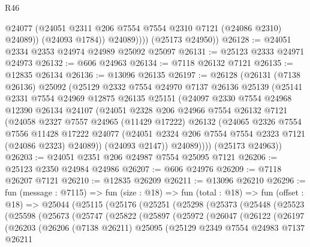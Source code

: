 \begin{lexlean}{R46}
\begin{coremodule}
                  @24077
                  (@24051 @2311 @206 @7554 @7554 @2310 @7121 (@24086 @2310) @24089))
                (@24093 @1784))
              @24089))))
      (@25173 @24950))
@26128 := @24051 @2334 @2353 @24974 @24989 @25092 @25097
@26131 := @25123 @2333 @24971 @24973
@26132 := @606 @24963
@26134 := @7118 @26132 @7121
@26135 := @12835 @26134
@26136 := @13096 @26135
@26197 := @26128
    (@26131
      (@7138 @26136)
      @25092
      (@25129
        @2332
        @7554
        @24970
        @7137
        @26136
        @25139
        (@25141
          @2331
          @7554
          @24969
          @12875
          @26135
          @25151
          (@24097
            @2330
            @7554
            @24968
            @12390
            @26134
            @24107
            (@24051
              @2328
              @206
              @24966
              @7554
              @26132
              @7121
              (@24058
                @2327
                @7557
                @24965
                (@11429 @17222)
                @26132
                (@24065
                  @2326
                  @7554
                  @7556
                  @11428
                  @17222
                  @24077
                  (@24051 @2324 @206 @7554 @7554 @2323 @7121 (@24086 @2323) @24089))
                (@24093 @2147))
              @24089))))
      (@25173 @24963))
@26203 := @24051 @2351 @206 @24987 @7554 @25095 @7121
@26206 := @25123 @2350 @24984 @24986
@26207 := @606 @24976
@26209 := @7118 @26207 @7121
@26210 := @12835 @26209
@26211 := @13096 @26210
@26296 := fun (message : @7115) =>
  fun (size : @18) =>
  fun (total : @18) =>
  fun (offset : @18) =>
  @25044
    (@25115
      (@25176
        (@25251
          (@25298
            (@25373
              (@25448
                (@25523
                  (@25598
                    (@25673
                      (@25747
                        (@25822
                          (@25897
                            (@25972
                              (@26047
                                (@26122
                                  (@26197
                                    (@26203
                                      (@26206
                                        (@7138 @26211)
                                        @25095
                                        (@25129
                                          @2349
                                          @7554
                                          @24983
                                          @7137
                                          @26211

\end{coremodule}
\end{lexlean}

